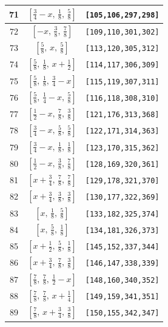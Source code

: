 \documentclass[fleqn,8pt]{jsarticle}
\begin{document}
\begin{longtable}{ccc}
71 & $\left[ \frac{3}{4} - x,\, \frac{1}{8},\, \frac{5}{8} \right]$ & {\tt [105,106,297,298]} \\ \hline
72 & $\left[ - x,\, \frac{3}{8},\, \frac{7}{8} \right]$ & {\tt [109,110,301,302]} \\ \hline
73 & $\left[ \frac{5}{8},\, x,\, \frac{5}{8} \right]$ & {\tt [113,120,305,312]} \\ \hline
74 & $\left[ \frac{5}{8},\, \frac{1}{8},\, x + \frac{1}{2} \right]$ & {\tt [114,117,306,309]} \\ \hline
75 & $\left[ \frac{5}{8},\, \frac{1}{8},\, \frac{3}{4} - x \right]$ & {\tt [115,119,307,311]} \\ \hline
76 & $\left[ \frac{5}{8},\, \frac{1}{4} - x,\, \frac{5}{8} \right]$ & {\tt [116,118,308,310]} \\ \hline
77 & $\left[ \frac{1}{2} - x,\, \frac{7}{8},\, \frac{3}{8} \right]$ & {\tt [121,176,313,368]} \\ \hline
78 & $\left[ \frac{3}{4} - x,\, \frac{5}{8},\, \frac{5}{8} \right]$ & {\tt [122,171,314,363]} \\ \hline
79 & $\left[ \frac{3}{4} - x,\, \frac{1}{8},\, \frac{1}{8} \right]$ & {\tt [123,170,315,362]} \\ \hline
80 & $\left[ \frac{1}{2} - x,\, \frac{3}{8},\, \frac{7}{8} \right]$ & {\tt [128,169,320,361]} \\ \hline
81 & $\left[ x + \frac{3}{4},\, \frac{7}{8},\, \frac{7}{8} \right]$ & {\tt [129,178,321,370]} \\ \hline
82 & $\left[ x + \frac{3}{4},\, \frac{3}{8},\, \frac{3}{8} \right]$ & {\tt [130,177,322,369]} \\ \hline
83 & $\left[ x,\, \frac{1}{8},\, \frac{5}{8} \right]$ & {\tt [133,182,325,374]} \\ \hline
84 & $\left[ x,\, \frac{5}{8},\, \frac{1}{8} \right]$ & {\tt [134,181,326,373]} \\ \hline
85 & $\left[ x + \frac{1}{2},\, \frac{5}{8},\, \frac{1}{8} \right]$ & {\tt [145,152,337,344]} \\ \hline
86 & $\left[ x + \frac{3}{4},\, \frac{7}{8},\, \frac{3}{8} \right]$ & {\tt [146,147,338,339]} \\ \hline
87 & $\left[ \frac{7}{8},\, \frac{7}{8},\, \frac{1}{2} - x \right]$ & {\tt [148,160,340,352]} \\ \hline
88 & $\left[ \frac{7}{8},\, \frac{7}{8},\, x + \frac{1}{4} \right]$ & {\tt [149,159,341,351]} \\ \hline
89 & $\left[ \frac{7}{8},\, x + \frac{3}{4},\, \frac{3}{8} \right]$ & {\tt [150,155,342,347]} \\ \hline

\end{longtable}
\end{document}
